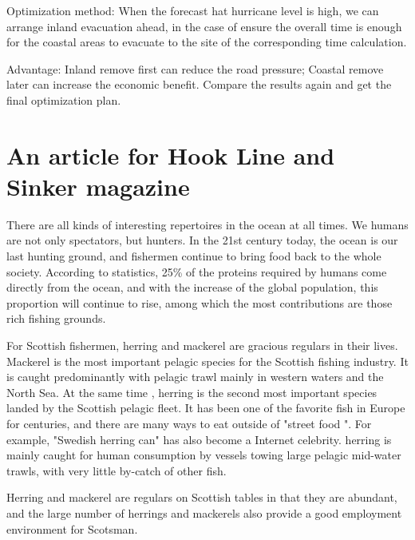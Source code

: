 \documentclass{mcmthesis}
\begin{document}
Optimization method: When the forecast hat hurricane level is high, we can arrange inland evacuation ahead, in the case of ensure the overall time is enough for the coastal areas to evacuate to the site of the corresponding time calculation.

Advantage: Inland remove first can reduce the road pressure; Coastal remove later can increase the economic benefit. Compare the results again and get the final optimization plan.


\section{An article for Hook Line and Sinker magazine}
There are all kinds of interesting repertoires in the ocean at all times. We humans are not only spectators, but hunters. In the 21st century today, the ocean is our last hunting ground, and fishermen continue to bring food back to the whole society. According to statistics, 25\% of the proteins required by humans come directly from the ocean, and with the increase of the global population, this proportion will continue to rise, among which the most contributions are those rich fishing grounds.

For Scottish fishermen, herring and mackerel are gracious regulars in their lives. Mackerel is the most important pelagic species for the Scottish fishing industry. It is caught predominantly with pelagic trawl mainly in western waters and the North Sea.
At the same time , herring is the second most important species landed by the Scottish pelagic fleet. It has been one of the favorite fish in Europe for centuries, and there are many ways to eat outside of "street food ". For example, "Swedish herring can" has also become a Internet celebrity. herring is mainly caught for human consumption by vessels towing large pelagic mid-water trawls, with very little by-catch of other fish. 

Herring and mackerel are regulars on Scottish tables in that they are abundant, and the large number of herrings and mackerels also provide a good employment environment for Scotsman.
\end{document}
